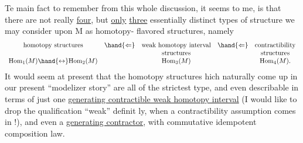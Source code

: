 Te main fact to remember from this whole discussion, it seems
to me, is that there are not really \uline{four}, but \uline{only} \uline{three} essentially
distinct types of structure  we may  consider upon M as homotopy-%
flavored structures, namely
\[
\begin{array}{ccccc}
\text{homotopy structures} & \hand{\Leftarrow} & \text{weak homotopy interval} & \hand{\Leftarrow} & \text{contractibility}\\
 & & \text{structures} & & \text{structures}\\
\mathrm{Hom}_1(M) \hand{\leftrightarrow} \mathrm{Hom}_2(M) & & \mathrm{Hom}_3(M) & & \mathrm{Hom}_4(M).
\end{array}
\]
It would seem at present that the homotopy structures hich naturally
come up in our present ``modelizer story'' are all of the strictest type,
and even describable in terms of just one \uline{generating contractible weak
homotopy interval} (I would like to drop the qualification ``weak'' definit%
ly, when a contractibility assumption comes in !), and even a \uline{generating
contractor}, with commutative idempotent composition law.

